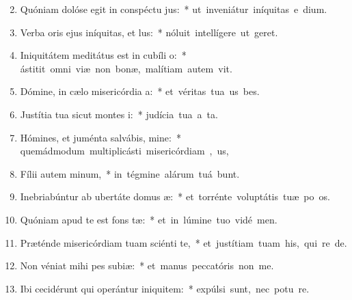 \begin{flushleft}
\begin{enumerate}[leftmargin=*]
\setcounter{enumi}{1}


\item Quóniam dolóse egit in conspéctu jus:~* \mbox{ut inveniátur iníquitas e  dium.}
\item Verba oris ejus iníquitas, et lus:~* \mbox{nóluit intellígere ut  geret.}
\item Iniquitátem meditátus est in cubíli o:~* \mbox{ástitit omni viæ non bonæ, malítiam autem  vit.}
\item Dómine, in cælo misericórdia a:~* \mbox{et véritas tua us  bes.}
\item Justítia tua sicut montes i:~* \mbox{judícia tua a ta.}
\item Hómines, et juménta salvábis, mine:~* \mbox{quemádmodum multiplicásti misericórdiam , us,}
\item Fílii autem minum,~* \mbox{in tégmine alárum tuá bunt.}
\item Inebriabúntur ab ubertáte domus æ:~* \mbox{et torrénte voluptátis tuæ po os.}
\item Quóniam apud te est fons tæ:~* \mbox{et in lúmine tuo vidé men.}
\item Præténde misericórdiam tuam sciénti te,~* \mbox{et justítiam tuam his, qui re  de.}
\item Non véniat mihi pes subiæ:~* \mbox{et manus peccatóris non  me.}
\item Ibi cecidérunt qui operántur iniquitem:~* \mbox{expúlsi sunt, nec potu re.}



\end{enumerate}
\end{flushleft}

